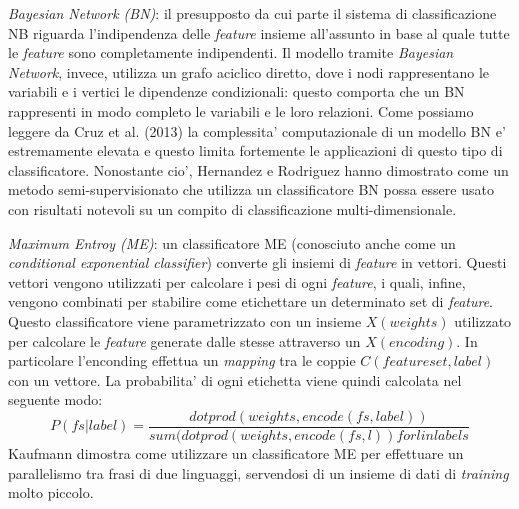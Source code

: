 \documentclass[a4paper,12pt,openright,twoside]{report}
\theoremstyle{definition}
\begin{document}
\emph{Bayesian Network (BN)}: il presupposto da cui parte il sistema di classificazione NB riguarda
l'indipendenza delle \emph{feature} insieme all'assunto in base al quale tutte le \emph{feature}
sono completamente indipendenti. Il modello tramite \emph{Bayesian Network}, invece, utilizza
un grafo aciclico diretto, dove i nodi rappresentano le variabili e i vertici le dipendenze condizionali:
 questo
comporta che un BN rappresenti in modo completo le variabili e le loro relazioni.
Come possiamo leggere da Cruz et al. (2013) la complessita' computazionale di un modello BN 
e' estremamente
elevata e questo limita fortemente le applicazioni di questo tipo di classificatore.
Nonostante cio', Hernandez e Rodriguez %
hanno dimostrato come un metodo semi-supervisionato che utilizza un classificatore BN possa essere
usato con risultati notevoli su un compito di classificazione multi-dimensionale.

\emph{Maximum Entroy (ME)}: un classificatore ME (conosciuto  anche come un \emph{conditional exponential classifier})
converte gli insiemi di \emph{feature} in vettori. Questi vettori vengono utilizzati per calcolare i pesi
di ogni \emph{feature}, i quali, infine, vengono combinati per stabilire come etichettare un determinato
set di \emph{feature}. Questo classificatore viene parametrizzato con un insieme $X(weights)$ utilizzato per 
calcolare le \emph{feature} generate dalle stesse attraverso un $X(encoding)$. In 
particolare l'enconding effettua un \emph{mapping} tra le coppie $C(featureset,label)$ con un vettore. La
probabilita' di ogni etichetta viene quindi calcolata nel seguente modo:
\begin{equation}
	P(fs|label)=\frac{dotprod(weights,encode(fs,label))}{sum(dotprod(weights,encode(fs,l))forlinlabels}
	\label{ME}
\end{equation}
Kaufmann %
dimostra come utilizzare un classificatore ME per effettuare un parallelismo tra frasi di due linguaggi,
 servendosi
di un insieme di dati di \emph{training} molto piccolo.
\end{document}
